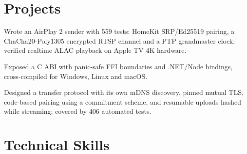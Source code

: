 \section{Projects}
\begin{bullets}
  \item Wrote an AirPlay 2 sender with 559 tests: HomeKit SRP/Ed25519 pairing, a ChaCha20-Poly1305 encrypted RTSP channel
        and a PTP grandmaster clock; verified realtime ALAC playback on Apple TV 4K hardware.
  \item Exposed a C ABI with panic-safe FFI boundaries and .NET/Node bindings, cross-compiled for Windows, Linux and macOS.
\end{bullets}

\begin{bullets}
  \item Designed a transfer protocol with its own mDNS discovery, pinned mutual TLS, code-based pairing using a commitment
        scheme, and resumable uploads hashed while streaming; covered by 406 automated tests.
\end{bullets}

\section{Technical Skills}


